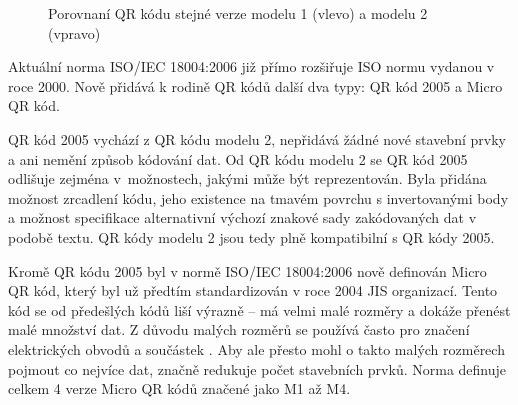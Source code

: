\begin{figure}[H]
  \begin{center}
    \caption{Porovnaní QR kódu stejné verze modelu 1 (vlevo) a modelu 2 (vpravo)}
    \label{QRCodeModel12Comparision}
  \end{center}
\end{figure}

Aktuální norma ISO/IEC 18004:2006 již přímo rozšiřuje ISO normu vydanou v roce 
2000. Nově přidává k rodině QR kódů další dva typy: QR kód 2005 a Micro QR kód. 

QR kód 2005 vychází z QR kódu modelu 2, nepřidává žádné nové stavební prvky 
a ani nemění způsob kódování dat. Od QR kódu modelu 2 se QR kód 2005 
odlišuje zejména v~možnostech, jakými může být reprezentován. Byla přidána
 možnost zrcadlení kódu, jeho existence na tmavém povrchu s invertovanými body 
 a možnost specifikace alternativní výchozí znakové sady zakódovaných dat v 
 podobě textu. QR kódy modelu 2 jsou tedy plně kompatibilní s QR kódy 2005. 

Kromě QR kódu 2005 byl v normě ISO/IEC 18004:2006 nově definován Micro QR kód, 
který byl už předtím standardizován v roce 2004 JIS organizací. Tento kód 
se od předešlých kódů liší výrazně -- má velmi malé rozměry a dokáže přenést 
malé množství dat. Z důvodu malých rozměrů se používá často pro značení 
elektrických obvodů a součástek \cite{microQRCodeDenso}. Aby ale přesto mohl o
takto malých rozměrech pojmout co nejvíce dat, značně redukuje počet stavebních
prvků. Norma definuje celkem 4 verze Micro QR kódů značené jako M1 až M4.


